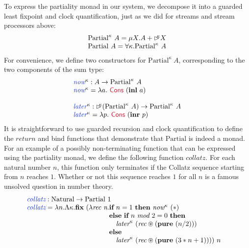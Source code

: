 \documentclass[natbib]{sigplanconf}
\newcommand{\cons}[1]{\textcolor{cons}{\textsf{#1}}}
\newcommand{\kw}[1]{\textbf{#1}}
\newcommand{\tyname}[1]{\textrm{#1}}
\newcommand{\ident}[1]{\textit{#1}}
\newcommand{\defn}[1]{\textcolor{defnd}{\ident{#1}}}
\newcommand{\delay}[1]{\mathord{\rhd\kern-0.4em^{#1}}}
\begin{document}
To express the partiality monad in our system, we decompose it into a
guarded least fixpoint and clock quantification, just as we did for
streams and stream processors above:
\begin{displaymath}
  \begin{array}{l}
    \tyname{Partial}^\kappa~A = \mu X. A + \delay\kappa X \\
    \tyname{Partial}~A = \forall \kappa. \tyname{Partial}^\kappa~A
  \end{array}
\end{displaymath}
For convenience, we define two constructors for
$\tyname{Partial}^\kappa~A$, corresponding to the two components of
the sum type:
\begin{displaymath}
  \begin{array}{l}
    \defn{now}^\kappa : A \to \tyname{Partial}^\kappa~A \\
    \defn{now}^\kappa = \lambda a.~\cons{Cons}~(\kw{inl}~a) \\
    \\
    \defn{later}^\kappa : \delay\kappa (\tyname{Partial}^\kappa~A) \to \tyname{Partial}^\kappa~A \\
    \defn{later}^\kappa = \lambda p.~\cons{Cons}~(\kw{inr}~p)
  \end{array}
\end{displaymath}
It is straightforward to use guarded recursion and clock
quantification to define the $\ident{return}$ and bind functions that
demonstrate that $\tyname{Partial}$ is indeed a monad. For an example
of a possibly non-terminating function that can be expressed using the
partiality monad, we define the following function
$\ident{collatz}$. For each natural number $n$, this function only
terminates if the Collatz sequence starting from $n$ reaches
$1$. Whether or not this sequence reaches $1$ for all $n$ is a famous
unsolved question in number theory.
\begin{displaymath}
  \begin{array}{@{}l}
    \defn{collatz} : \tyname{Natural} \to \tyname{Partial}~1 \\
    \defn{collatz} = \lambda n. \Lambda \kappa. \kw{fix}~(\lambda \ident{rec}~\ident{n}.
    \begin{array}[t]{@{}l}
      \kw{if}~n = 1~\kw{then}~\ident{now}^\kappa~(*) \\
      \kw{else}~\kw{if}~n~\ident{mod}~2 = 0~\kw{then} \\
      \quad \ident{later}^\kappa~(\ident{rec} \circledast (\kw{pure}~(n/2))) \\
      \kw{else} \\
      \quad \ident{later}^\kappa~(\ident{rec} \circledast (\kw{pure}~(3*n + 1))))~n
    \end{array}
  \end{array}
\end{displaymath}
\end{document}
